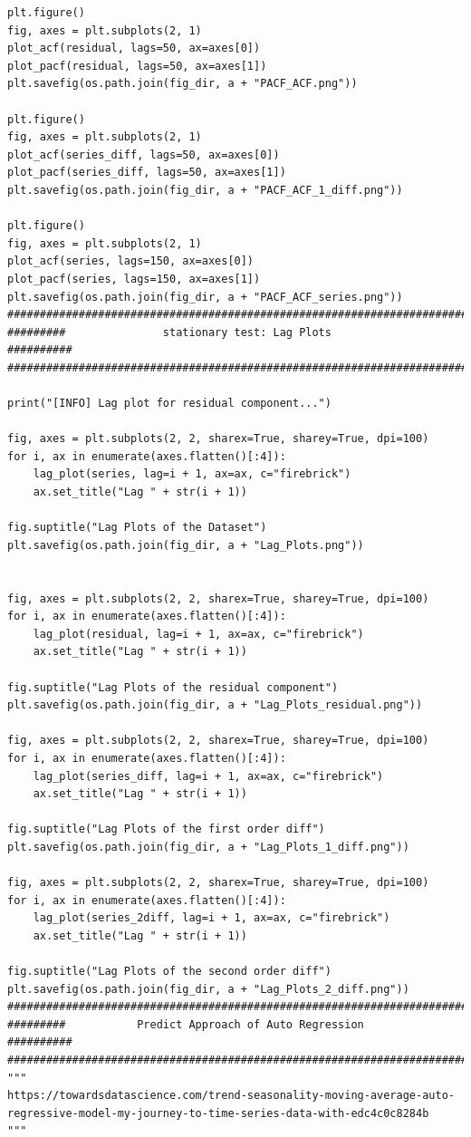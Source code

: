 \documentclass[12pt]{article}
\begin{document}
\begin{lstlisting}
plt.figure()
fig, axes = plt.subplots(2, 1)
plot_acf(residual, lags=50, ax=axes[0])
plot_pacf(residual, lags=50, ax=axes[1])
plt.savefig(os.path.join(fig_dir, a + "PACF_ACF.png"))

plt.figure()
fig, axes = plt.subplots(2, 1)
plot_acf(series_diff, lags=50, ax=axes[0])
plot_pacf(series_diff, lags=50, ax=axes[1])
plt.savefig(os.path.join(fig_dir, a + "PACF_ACF_1_diff.png"))

plt.figure()
fig, axes = plt.subplots(2, 1)
plot_acf(series, lags=150, ax=axes[0])
plot_pacf(series, lags=150, ax=axes[1])
plt.savefig(os.path.join(fig_dir, a + "PACF_ACF_series.png"))
############################################################################
#########               stationary test: Lag Plots                ##########
############################################################################

print("[INFO] Lag plot for residual component...")

fig, axes = plt.subplots(2, 2, sharex=True, sharey=True, dpi=100)
for i, ax in enumerate(axes.flatten()[:4]):
    lag_plot(series, lag=i + 1, ax=ax, c="firebrick")
    ax.set_title("Lag " + str(i + 1))

fig.suptitle("Lag Plots of the Dataset")
plt.savefig(os.path.join(fig_dir, a + "Lag_Plots.png"))


fig, axes = plt.subplots(2, 2, sharex=True, sharey=True, dpi=100)
for i, ax in enumerate(axes.flatten()[:4]):
    lag_plot(residual, lag=i + 1, ax=ax, c="firebrick")
    ax.set_title("Lag " + str(i + 1))

fig.suptitle("Lag Plots of the residual component")
plt.savefig(os.path.join(fig_dir, a + "Lag_Plots_residual.png"))

fig, axes = plt.subplots(2, 2, sharex=True, sharey=True, dpi=100)
for i, ax in enumerate(axes.flatten()[:4]):
    lag_plot(series_diff, lag=i + 1, ax=ax, c="firebrick")
    ax.set_title("Lag " + str(i + 1))

fig.suptitle("Lag Plots of the first order diff")
plt.savefig(os.path.join(fig_dir, a + "Lag_Plots_1_diff.png"))

fig, axes = plt.subplots(2, 2, sharex=True, sharey=True, dpi=100)
for i, ax in enumerate(axes.flatten()[:4]):
    lag_plot(series_2diff, lag=i + 1, ax=ax, c="firebrick")
    ax.set_title("Lag " + str(i + 1))

fig.suptitle("Lag Plots of the second order diff")
plt.savefig(os.path.join(fig_dir, a + "Lag_Plots_2_diff.png"))
############################################################################
#########           Predict Approach of Auto Regression           ##########
############################################################################
"""
https://towardsdatascience.com/trend-seasonality-moving-average-auto-regressive-model-my-journey-to-time-series-data-with-edc4c0c8284b
"""



\end{lstlisting}
\end{document}

